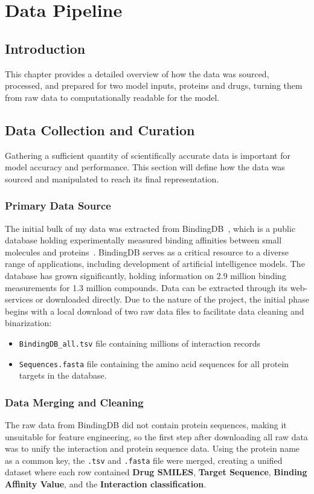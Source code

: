 \chapter{Data Pipeline}
\label{chap:data-pipeline}
\sloppy
\section{Introduction}
This chapter provides a detailed overview of how the data was sourced, processed, and prepared for two model inputs, proteins and drugs, turning them from raw data to computationally readable for the model.

\section{Data Collection and Curation}
Gathering a sufficient quantity of scientifically accurate data is important for model accuracy and performance.
This section will define how the data was sourced and manipulated to reach its final representation.
\subsection{Primary Data Source}
The initial bulk of my data was extracted from BindingDB~\citep{bindingdb_web}, which is a public database holding experimentally measured binding affinities between small molecules and proteins~\citep{Liu2025}.
BindingDB serves as a critical resource to a diverse range of applications, including development of artificial intelligence models.
The database has grown significantly, holding information on 2.9 million binding measurements for 1.3 million compounds.
Data can be extracted through its web-services or downloaded directly.
Due to the nature of the project, the initial phase begins with a local download of two raw data files to facilitate data cleaning and binarization:
\begin{itemize}
    \item \texttt{BindingDB\_all.tsv} file containing millions of interaction records
    \item \texttt{Sequences.fasta} file containing the amino acid sequences for all protein targets in the database.
\end{itemize} 
\subsection{Data Merging and Cleaning}
The raw data from BindingDB did not contain protein sequences, making it unsuitable for feature engineering, so the first step after downloading all raw data was to unify the interaction and protein sequence data.
Using the protein name as a common key, the \texttt{.tsv} and \texttt{.fasta} file were merged, creating a unified dataset where each row contained \textbf{Drug SMILES}, \textbf{Target Sequence}, \textbf{Binding Affinity Value}, and the \textbf{Interaction classification}.

